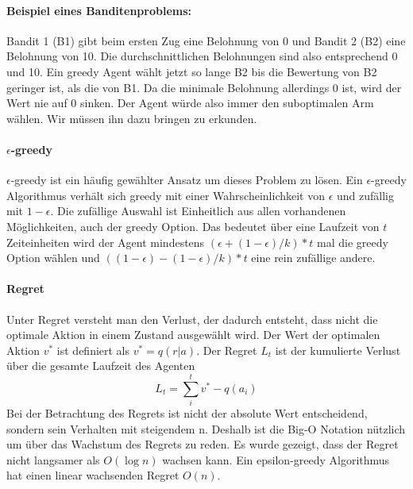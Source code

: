 \paragraph{Beispiel eines Banditenproblems:}
Bandit 1 (B1) gibt beim ersten Zug eine Belohnung von 0 und Bandit 2 (B2) eine Belohnung von 10. Die durchschnittlichen Belohnungen sind also entsprechend 0 und 10. Ein greedy Agent wählt jetzt so lange B2 bis die Bewertung von B2 geringer ist, als die von B1. Da die minimale Belohnung allerdings 0 ist, wird der Wert nie auf 0 sinken. Der Agent würde also immer den suboptimalen Arm wählen. Wir müssen ihn dazu bringen zu erkunden.
\paragraph{$\epsilon$-greedy}
$\epsilon$-greedy ist ein häufig gewählter Ansatz um dieses Problem zu lösen. Ein $\epsilon$-greedy Algorithmus verhält sich greedy mit einer Wahrscheinlichkeit von $\epsilon$ und zufällig mit $1-\epsilon$. Die zufällige Auswahl ist Einheitlich aus allen vorhandenen Möglichkeiten, auch der greedy Option. Das bedeutet über eine Laufzeit von $t$ Zeiteinheiten wird der Agent mindestens $(\epsilon + (1-\epsilon)/k) * t$ mal die greedy Option wählen und $((1-\epsilon) - (1-\epsilon)/k) * t$ eine rein zufällige andere.\\
\paragraph{Regret}
Unter Regret versteht man den Verlust, der dadurch entsteht, dass nicht die optimale Aktion in einem Zustand ausgewählt wird. Der Wert der optimalen Aktion $v^*$ ist definiert als $v^* = q(r | a)$. Der Regret $L_t$ ist der kumulierte Verlust über die gesamte Laufzeit des Agenten
\begin{equation}
L_t = \sum_{i}^{t}v^* - q(a_i)
\end{equation}
Bei der Betrachtung des Regrets ist nicht der absolute Wert entscheidend, sondern sein Verhalten mit steigendem n. Deshalb ist die Big-O Notation nützlich um über das Wachstum des Regrets zu reden. Es wurde gezeigt, dass der Regret nicht langsamer als $O(\log n)$ wachsen kann. Ein epsilon-greedy Algorithmus hat einen linear wachsenden Regret $O(n)$.

